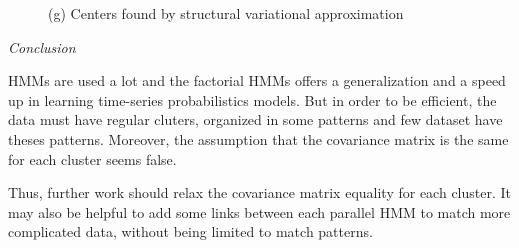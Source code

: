 \documentclass[10pt,a4paper]{report}
\begin{document}
\begin{figure}[h]
\begin{minipage}[b]{0.48\linewidth}
		\begin{center}
			\large{(g) Centers found by structural
				variational approximation}
			\end{center}\medskip
	\end{minipage}
	\label{fig:f}
\end{figure}

\vspace{30pt}
\begin{center}
	\Huge{\textit{Conclusion}}
\end{center}
\vspace{20pt}

HMMs are used a lot and the factorial HMMs offers a generalization and a speed up in learning time-series probabilistics models. But in order to be efficient, the data must have regular cluters, organized in some patterns and few dataset have theses patterns. Moreover, the assumption that the covariance matrix is the same for each cluster seems false.
\newline

Thus, further work should relax the covariance matrix equality for each cluster. It may also be helpful to add some links between each parallel HMM to match more complicated data, without being limited to match patterns.

\end{document}
